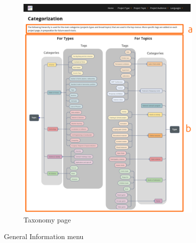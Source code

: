 \begin{landscape}
\begin{figure}[p]
\begin{subfigure}[c]{.5\textwidth}
            \includegraphics[width=1.2\linewidth]{Image/Architecture/structure_taxonomy.png}
            \caption{Taxonomy page}
            \label{fig:structure_taxonomy}
        \end{subfigure}
        \label{fig:gform}
        \caption{General Information menu}
    \end{figure}

\end{landscape}